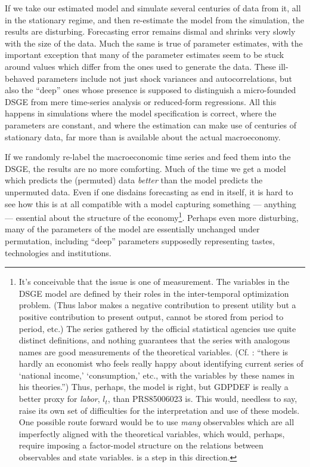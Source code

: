 \documentclass[11pt]{article}
\begin{document}
If we take our estimated model and simulate several centuries of data
from it, all in the stationary regime, and then re-estimate the model
from the simulation, the results are disturbing. Forecasting error
remains dismal and shrinks very slowly with the size of the data. Much
the same is true of parameter estimates, with the important exception
that many of the parameter estimates seem to be stuck around values
which differ from the ones used to generate the data. These ill-behaved
parameters include not just shock variances and autocorrelations, but
also the ``deep'' ones whose presence is supposed to distinguish a
micro-founded DSGE from mere time-series analysis or reduced-form
regressions. All this happens in simulations where the model
specification is correct, where the parameters are constant, and where
the estimation can make use of centuries of stationary data, far more
than is available about the actual macroeconomy.

If we randomly re-label the macroeconomic time series and feed them into
the DSGE, the results are no more comforting. Much of the time we get a
model which predicts the (permuted) data \emph{better} than the model
predicts the unpermuted data. Even if one disdains forecasting as end in
itself, it is hard to see how this is at all compatible with a model
capturing something --- anything --- essential about the structure of
the economy\footnote{It's conceivable that the issue is one of
  measurement. The variables in the DSGE model are defined by their
  roles in the inter-temporal optimization problem. (Thus labor makes a
  negative contribution to present utility but a positive contribution
  to present output, cannot be stored from period to period, etc.) The
  series gathered by the official statistical agencies use quite
  distinct definitions, and nothing guarantees that the series with
  analogous names are good measurements of the theoretical variables.
  (Cf. \citet[p. 6]{Haavelmo-probability-approach}: ``there is hardly an
  economist who feels really happy about identifying current series of
  `national income,' `consumption,' etc., with the variables by these
  names in his theories.'') Thus, perhaps, the model is right, but
  GDPDEF is really a better proxy for \emph{labor}, \(l_t\), than
  PRS85006023 is. This would, needless to say, raise its own set of
  difficulties for the interpretation and use of these models. One
  possible route forward would be to use \emph{many} observables which
  are all imperfectly aligned with the theoretical variables, which
  would, perhaps, require imposing a factor-model structure on the
  relations between observables and state variables.
  \citet{Boivin-Giannoni-DSGEs-in-data-rich-environment} is a step in
  this direction.}. Perhaps even more disturbing, many of the parameters
of the model are essentially unchanged under permutation, including
``deep'' parameters supposedly representing tastes, technologies and
institutions.
\end{document}
